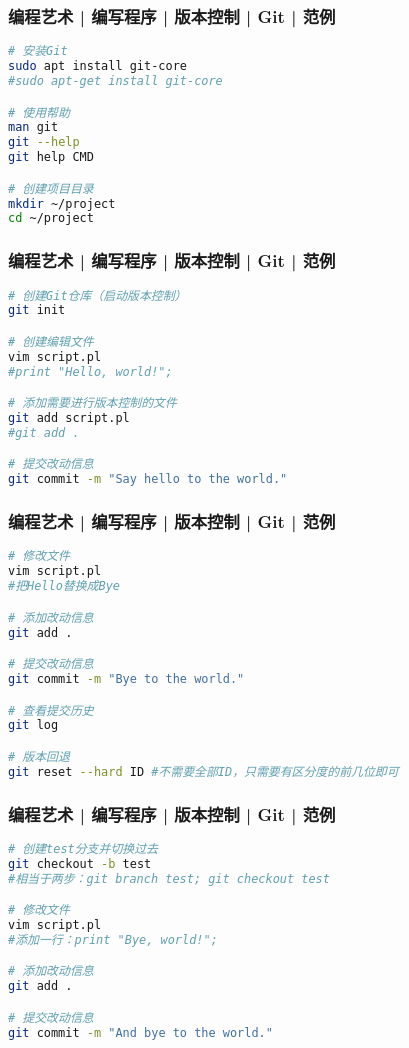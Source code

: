 \begin{frame}[fragile]
  \frametitle{编程艺术 | 编写程序 | 版本控制 | Git | \alert{范例}}
\begin{lstlisting}[language=sh]
# 安装Git
sudo apt install git-core
#sudo apt-get install git-core

# 使用帮助
man git
git --help
git help CMD

# 创建项目目录
mkdir ~/project
cd ~/project
\end{lstlisting}
\end{frame}

\begin{frame}[fragile]
  \frametitle{编程艺术 | 编写程序 | 版本控制 | Git | \alert{范例}}
  \vspace{-1.5em}
\begin{lstlisting}[language=sh]
# 创建Git仓库（启动版本控制）
git init

# 创建编辑文件
vim script.pl
#print "Hello, world!";

# 添加需要进行版本控制的文件
git add script.pl
#git add .

# 提交改动信息
git commit -m "Say hello to the world."
\end{lstlisting}
\end{frame}

\begin{frame}[fragile]
  \frametitle{编程艺术 | 编写程序 | 版本控制 | Git | 范例}
  \vspace{-1.5em}
\begin{lstlisting}[language=sh]
# 修改文件
vim script.pl
#把Hello替换成Bye

# 添加改动信息
git add .

# 提交改动信息
git commit -m "Bye to the world."

# 查看提交历史
git log

# 版本回退
git reset --hard ID #不需要全部ID，只需要有区分度的前几位即可
\end{lstlisting}
\end{frame}

\begin{frame}[fragile]
  \frametitle{编程艺术 | 编写程序 | 版本控制 | Git | \alert{范例}}
  \vspace{-1.5em}
\begin{lstlisting}[language=sh]
# 创建test分支并切换过去
git checkout -b test
#相当于两步：git branch test; git checkout test

# 修改文件
vim script.pl
#添加一行：print "Bye, world!";

# 添加改动信息
git add .

# 提交改动信息
git commit -m "And bye to the world."
\end{lstlisting}
\end{frame}

